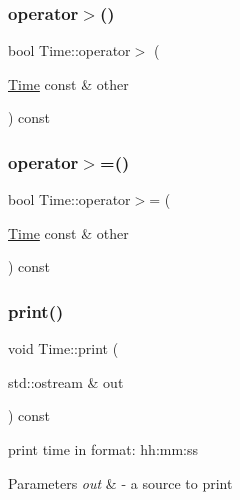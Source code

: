 \mbox{\label{classTime_a6d544b6af2fd13223a5436d34964fe3a}} 
\subsubsection{\texorpdfstring{operator$>$()}{operator>()}}
{\footnotesize\ttfamily bool Time\+::operator$>$ (\begin{DoxyParamCaption}\item[{\hyperlink{classTime}{Time} const \&}]{other }\end{DoxyParamCaption}) const}

\mbox{\label{classTime_a1f7d030e8a6095b0bcd41bf4c5db3719}} 
\subsubsection{\texorpdfstring{operator$>$=()}{operator>=()}}
{\footnotesize\ttfamily bool Time\+::operator$>$= (\begin{DoxyParamCaption}\item[{\hyperlink{classTime}{Time} const \&}]{other }\end{DoxyParamCaption}) const}

\mbox{\label{classTime_a2596ef53ebb188dc75b88160bd0aa230}} 
\subsubsection{\texorpdfstring{print()}{print()}}
{\footnotesize\ttfamily void Time\+::print (\begin{DoxyParamCaption}\item[{std\+::ostream \&}]{out }\end{DoxyParamCaption}) const}

print time in format\+: hh\+:mm\+:ss 
\begin{DoxyParams}{Parameters}
{\em out} & -\/ a source to print \\
\hline
\end{DoxyParams}
\mbox{\label{classTime_acab7dbc13c8a0d9a0f33047d41f4aee0}} 
